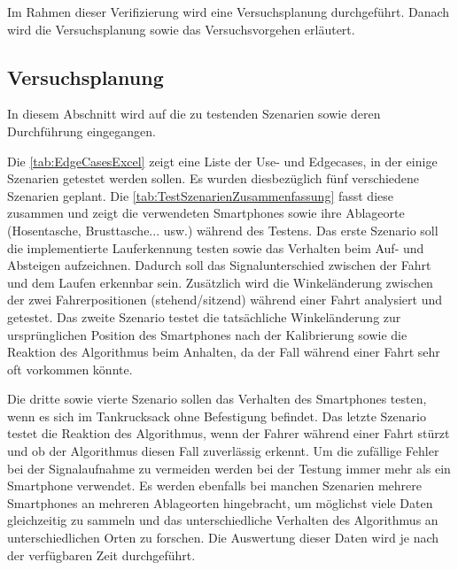 Im Rahmen dieser Verifizierung wird eine Versuchsplanung durchgeführt. Danach wird die Versuchsplanung sowie das Versuchsvorgehen erläutert.
%
%
%
\subsection{Versuchsplanung} \label{ab:Versuchsplanung}

In diesem Abschnitt wird auf die zu testenden Szenarien sowie deren Durchführung eingegangen.

Die \autoref{tab:EdgeCasesExcel} zeigt eine Liste der Use- und Edgecases, in der einige Szenarien getestet werden sollen. Es wurden diesbezüglich fünf verschiedene Szenarien geplant.
Die \autoref{tab:TestSzenarienZusammenfassung} fasst diese zusammen und zeigt die verwendeten Smartphones sowie ihre Ablageorte (Hosentasche, Brusttasche... usw.) während des Testens. Das erste Szenario soll die implementierte Lauferkennung testen sowie das Verhalten beim Auf- und Absteigen aufzeichnen. Dadurch soll das Signalunterschied zwischen der Fahrt und dem Laufen erkennbar sein.
Zusätzlich wird die Winkeländerung zwischen der zwei Fahrerpositionen (stehend/sitzend) während einer Fahrt analysiert und getestet.
Das zweite Szenario testet die tatsächliche Winkeländerung zur ursprünglichen Position des Smartphones nach der Kalibrierung sowie die Reaktion des Algorithmus beim Anhalten, da der Fall während einer Fahrt sehr oft vorkommen könnte.

Die dritte sowie vierte Szenario sollen das Verhalten des Smartphones testen, wenn es sich im Tankrucksack ohne Befestigung befindet.
Das letzte Szenario testet die Reaktion des Algorithmus, wenn der Fahrer während einer Fahrt stürzt und ob der Algorithmus diesen Fall zuverlässig erkennt.
Um die zufällige Fehler bei der Signalaufnahme zu vermeiden werden bei der Testung immer mehr als ein Smartphone verwendet.
Es werden ebenfalls bei manchen Szenarien mehrere Smartphones an mehreren Ablageorten hingebracht, um möglichst viele Daten gleichzeitig zu sammeln und das unterschiedliche Verhalten des Algorithmus an unterschiedlichen Orten zu forschen.
Die Auswertung dieser Daten wird je nach der verfügbaren Zeit durchgeführt.

